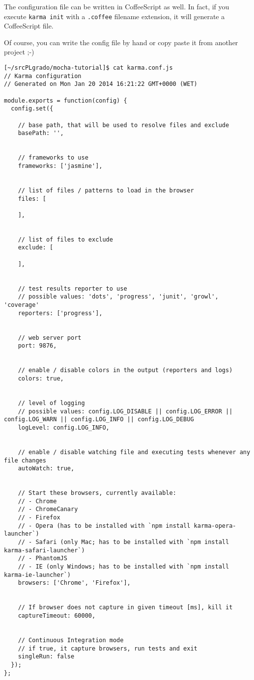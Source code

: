 The configuration file can be written in CoffeeScript as well. In fact,
if you execute \verb|karma init| with a \verb|.coffee| filename extension, it will
generate a CoffeeScript file.

Of course, you can write the config file by hand or copy paste it from another project ;-)

\begin{verbatim}
[~/srcPLgrado/mocha-tutorial]$ cat karma.conf.js 
// Karma configuration
// Generated on Mon Jan 20 2014 16:21:22 GMT+0000 (WET)

module.exports = function(config) {
  config.set({

    // base path, that will be used to resolve files and exclude
    basePath: '',


    // frameworks to use
    frameworks: ['jasmine'],


    // list of files / patterns to load in the browser
    files: [
      
    ],


    // list of files to exclude
    exclude: [
      
    ],


    // test results reporter to use
    // possible values: 'dots', 'progress', 'junit', 'growl', 'coverage'
    reporters: ['progress'],


    // web server port
    port: 9876,


    // enable / disable colors in the output (reporters and logs)
    colors: true,


    // level of logging
    // possible values: config.LOG_DISABLE || config.LOG_ERROR || config.LOG_WARN || config.LOG_INFO || config.LOG_DEBUG
    logLevel: config.LOG_INFO,


    // enable / disable watching file and executing tests whenever any file changes
    autoWatch: true,


    // Start these browsers, currently available:
    // - Chrome
    // - ChromeCanary
    // - Firefox
    // - Opera (has to be installed with `npm install karma-opera-launcher`)
    // - Safari (only Mac; has to be installed with `npm install karma-safari-launcher`)
    // - PhantomJS
    // - IE (only Windows; has to be installed with `npm install karma-ie-launcher`)
    browsers: ['Chrome', 'Firefox'],


    // If browser does not capture in given timeout [ms], kill it
    captureTimeout: 60000,


    // Continuous Integration mode
    // if true, it capture browsers, run tests and exit
    singleRun: false
  });
};
\end{verbatim}

